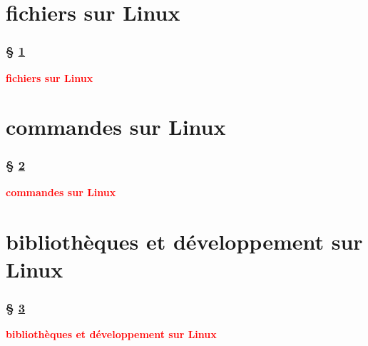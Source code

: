 \documentclass[lualatex,11pt,a4paper,svgnames,french]{beamer}
\newcommand{\clbrougras}[1]{{\textcolor{Red}{\textbf{#1}}}}
\begin{document}
\section{fichiers sur Linux}
\label{sec:file}
\begin{frame}\frametitle{§ \ref{sec:file}}
{\Large \clbrougras{fichiers sur Linux}}
\end{frame}

\section{commandes sur Linux}
\label{sec:commands}
\begin{frame}\frametitle{§ \ref{sec:commands}}
{\Large \clbrougras{commandes sur Linux}}
\end{frame}

\section{bibliothèques et développement sur Linux}
\label{sec:libr-devel}
\begin{frame}\frametitle{§ \ref{sec:libr-devel}}
{\Large \clbrougras{bibliothèques et développement sur Linux}}
\end{frame}
\end{document}
